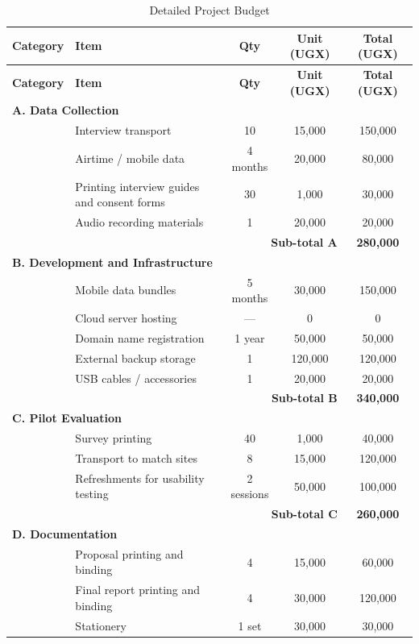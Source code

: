 \documentclass[12pt,a4paper]{report}
\begin{document}
\begin{longtable}{p{3.5cm}p{4.5cm}ccc}
\caption{Detailed Project Budget}\\
\toprule
\textbf{Category} & \textbf{Item} & \textbf{Qty} & \textbf{Unit (UGX)} & \textbf{Total (UGX)}\\
\midrule
\endfirsthead
\toprule
\textbf{Category} & \textbf{Item} & \textbf{Qty} & \textbf{Unit (UGX)} & \textbf{Total (UGX)}\\
\midrule
\endhead
\multicolumn{5}{l}{\textbf{A. Data Collection}}\\
\midrule
 & Interview transport & 10 & 15,000 & 150,000\\
 & Airtime / mobile data & 4 months & 20,000 & 80,000\\
 & Printing interview guides and consent forms & 30 & 1,000 & 30,000\\
 & Audio recording materials & 1 & 20,000 & 20,000\\
\midrule
\multicolumn{4}{r}{\textbf{Sub-total A}} & \textbf{280,000}\\
\midrule
\multicolumn{5}{l}{\textbf{B. Development and Infrastructure}}\\
\midrule
 & Mobile data bundles & 5 months & 30,000 & 150,000\\
 & Cloud server hosting & --- & 0 & 0\\
 & Domain name registration & 1 year & 50,000 & 50,000\\
 & External backup storage & 1 & 120,000 & 120,000\\
 & USB cables / accessories & 1 & 20,000 & 20,000\\
\midrule
\multicolumn{4}{r}{\textbf{Sub-total B}} & \textbf{340,000}\\
\midrule
\multicolumn{5}{l}{\textbf{C. Pilot Evaluation}}\\
\midrule
 & Survey printing & 40 & 1,000 & 40,000\\
 & Transport to match sites & 8 & 15,000 & 120,000\\
 & Refreshments for usability testing & 2 sessions & 50,000 & 100,000\\
\midrule
\multicolumn{4}{r}{\textbf{Sub-total C}} & \textbf{260,000}\\
\midrule
\multicolumn{5}{l}{\textbf{D. Documentation}}\\
\midrule
 & Proposal printing and binding & 4 & 15,000 & 60,000\\
 & Final report printing and binding & 4 & 30,000 & 120,000\\
 & Stationery & 1 set & 30,000 & 30,000\\

\end{longtable}
\end{document}
